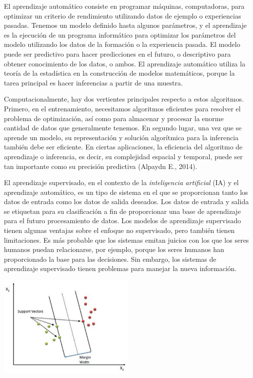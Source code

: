 El aprendizaje automático consiste en programar máquinas, computadoras, para optimizar un criterio de rendimiento utilizando datos de ejemplo o experiencias pasadas. Tenemos un modelo definido hasta algunos parámetros, y el aprendizaje es la ejecución de un programa informático para optimizar los parámetros del modelo utilizando los datos de la formación o la experiencia pasada. El modelo puede ser predictivo para hacer predicciones en el futuro, o descriptivo para obtener conocimiento de los datos, o ambos. El aprendizaje automático utiliza la teoría de la estadística en la construcción de modelos matemáticos, porque la tarea principal es hacer inferencias a partir de una muestra.  

Computacionalmente, hay dos vertientes principales respecto a estos algoritmos. Primero, en el entrenamiento, necesitamos algoritmos eficientes para resolver el problema de optimización, así como para almacenar y procesar la enorme cantidad de datos que generalmente tenemos. En segundo lugar, una vez que se aprende un modelo, su representación y solución algorítmica para la inferencia también debe ser eficiente. En ciertas aplicaciones, la eficiencia del algoritmo de aprendizaje o inferencia, es decir, su complejidad espacial y temporal, puede ser tan importante como su precisión predictiva (Alpaydn E., 2014).

El aprendizaje supervisado, en el contexto de la \textit{inteligencia artificial} (IA) y el aprendizaje automático, es un tipo de sistema en el que se proporcionan tanto los datos de entrada como los datos de salida deseados. Los datos de entrada y salida se etiquetan para su clasificación a fin de proporcionar una base de aprendizaje para el futuro procesamiento de datos. Los modelos de aprendizaje supervisado tienen algunas ventajas sobre el enfoque no supervisado, pero también tienen limitaciones. Es más probable que los sistemas emitan juicios con los que los seres humanos puedan relacionarse, por ejemplo, porque los seres humanos han proporcionado la base para las decisiones. Sin embargo, los sistemas de aprendizaje supervisado tienen problemas para manejar la nueva información. 
\begin{center}
\includegraphics[height=2.0in]{figuras/Capture3.PNG}
\end{center}

